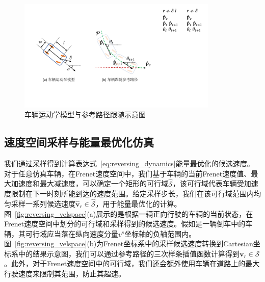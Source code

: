 \begin{figure}[!tbh]
\centering
\includegraphics[width=0.85\textwidth]{figure/reversing/bicycle model v4.pdf}
\caption[车辆运动学模型与参考路径跟随示意图]{
车辆运动学模型与参考路径跟随示意图
}
\label{fig:reversing_bicycle}
\end{figure}



\subsection{速度空间采样与能量最优化仿真}
\label{section:reversing_optimize}

我们通过采样得到计算表达式~\ref{eq:reversing_dynamics}能量最优化的候选速度。对于任意仿真车辆，在Frenet速度空间中，我们基于车辆的当前Frenet速度值、最大加速度和最大减速度，可以确定一个矩形的可行域$\hat{\mathcal{S}}$，该可行域代表车辆受加速度限制在下一时刻所能到达的速度范围。给定采样步长，我们在该可行域范围内均匀采样一系列候选速度$\hat{\textbf{v}}_{r} \in \hat{\mathcal{S}}$，用于能量最优化的计算。图~\ref{fig:reversing_velspace}(a)展示的是根据一辆正向行驶的车辆的当前状态，在Frenet速度空间中划分的可行域和采样得到的候选速度。假如是一辆倒车中的车辆，其可行域应当落在纵向速度分量$v^{s}$坐标轴的负轴范围内。图~\ref{fig:reversing_velspace}(b)为Frenet坐标系中的采样候选速度转换到Cartesian坐标系中的结果示意图，我们可以通过参考路径的三次样条插值函数计算得到$\textbf{v}_{r} \in \mathcal{S}$。此外，对于Frenet速度空间中的可行域，我们还会额外使用车辆在道路上的最大行驶速度来限制其范围，防止其超速。



